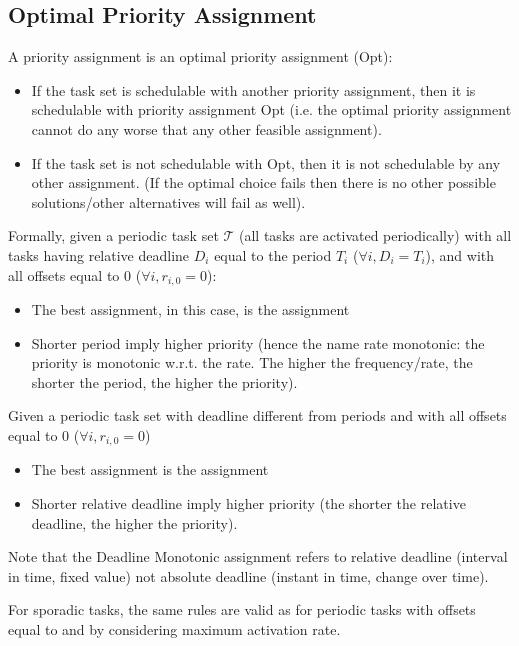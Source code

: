 \subsection{Optimal Priority Assignment}

A priority assignment is an optimal priority assignment (Opt):
\begin{itemize}
\item If the task set is schedulable with another priority assignment, then it is schedulable with priority assignment Opt (i.e. the optimal priority assignment cannot do any worse that any other feasible assignment).
\item If the task set is not schedulable with Opt, then it is not schedulable by any other assignment. (If the optimal choice fails then there is no other possible solutions/other alternatives will fail as well).
\end{itemize}

Formally, given a periodic task set $\mathcal{T}$ (all tasks are activated periodically) with all tasks having relative deadline $D_i$ equal to the period $T_i$ ($\forall i, D_i = T_i$), and with all offsets equal to 0 ($\forall i, r_{i,0} = 0$):
\begin{itemize}
\item The best assignment, in this case, is the  assignment
\item Shorter period imply higher priority (hence the name rate monotonic: the priority is monotonic w.r.t. the rate. The higher the frequency/rate, the shorter the period, the higher the priority).
\end{itemize}

Given a periodic task set with deadline different from periods and with all offsets equal to 0 ($\forall i, r_{i,0} = 0$)
\begin{itemize}
\item The best assignment is the  assignment
\item Shorter relative deadline imply higher priority (the shorter the relative deadline, the higher the priority).
\end{itemize}
Note that the Deadline Monotonic assignment refers to relative deadline (interval in time, fixed value) not absolute deadline (instant in time, change over time).

For sporadic tasks, the same rules are valid as for periodic tasks with offsets equal to  and by considering maximum activation rate.













